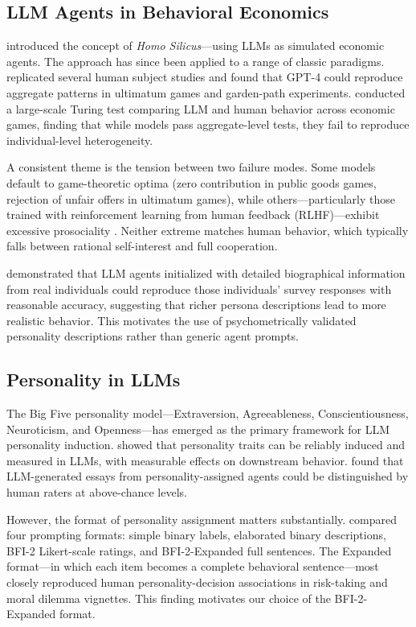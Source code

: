 \documentclass[12pt, a4paper]{article}
\begin{document}
\subsection{LLM Agents in Behavioral Economics}

\citet{horton2023homo} introduced the concept of \emph{Homo Silicus}---using LLMs as simulated economic agents. The approach has since been applied to a range of classic paradigms. \citet{aher2023turing} replicated several human subject studies and found that GPT-4 could reproduce aggregate patterns in ultimatum games and garden-path experiments. \citet{mei2024turing} conducted a large-scale Turing test comparing LLM and human behavior across economic games, finding that while models pass aggregate-level tests, they fail to reproduce individual-level heterogeneity.

A consistent theme is the tension between two failure modes. Some models default to game-theoretic optima (zero contribution in public goods games, rejection of unfair offers in ultimatum games), while others---particularly those trained with reinforcement learning from human feedback (RLHF)---exhibit excessive prosociality \citep{salecha2024social}. Neither extreme matches human behavior, which typically falls between rational self-interest and full cooperation.

\citet{park2024generative} demonstrated that LLM agents initialized with detailed biographical information from real individuals could reproduce those individuals' survey responses with reasonable accuracy, suggesting that richer persona descriptions lead to more realistic behavior. This motivates the use of psychometrically validated personality descriptions rather than generic agent prompts.

\subsection{Personality in LLMs}

The Big Five personality model---Extraversion, Agreeableness, Conscientiousness, Neuroticism, and Openness---has emerged as the primary framework for LLM personality induction. \citet{serapio2024personality} showed that personality traits can be reliably induced and measured in LLMs, with measurable effects on downstream behavior. \citet{jiang2024personallm} found that LLM-generated essays from personality-assigned agents could be distinguished by human raters at above-chance levels.

However, the format of personality assignment matters substantially. \citet{huang2024designing} compared four prompting formats: simple binary labels, elaborated binary descriptions, BFI-2 Likert-scale ratings, and BFI-2-Expanded full sentences. The Expanded format---in which each item becomes a complete behavioral sentence---most closely reproduced human personality-decision associations in risk-taking and moral dilemma vignettes. This finding motivates our choice of the BFI-2-Expanded format.
\end{document}
